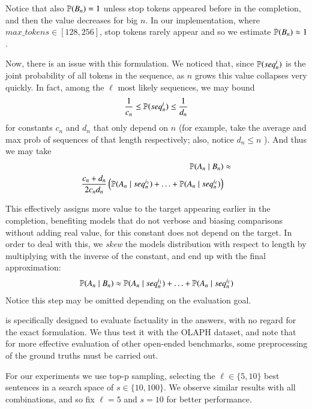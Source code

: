 Notice that also $\mathbb{P}(B_n) = 1$ unless stop tokens appeared before in the completion, and then the value decreases for big $n$. In our implementation, where $max\_tokens \in [128, 256]$, stop tokens rarely appear and so we estimate $\mathbb{P}(B_n) \approx 1$.


Now, there is an issue with this formulation. We noticed that, since $\mathbb{P}(seq_n^{i})$ is the joint probability of all tokens in the sequence, as $n$ grows this value collapses very quickly. In fact, among the $\ell$ most likely sequences, we may bound 
\begin{align*}
    \frac{1}{c_n} \leq \mathbb{P}(seq_n^i) \leq \frac{1}{d_n}
\end{align*}
for constants $c_n$ and $d_n$ that only depend on $n$ (for example, take the average and max prob of sequences of that length respectively; also, notice $d_n \leq n$ ). And thus we may take
\begin{align*}
    \mathbb{P}(A_n \mid B_n) &\approx \\ \frac{c_n + d_n}{2 c_n d_n} \left( \mathbb{P}(A_n \mid seq^{i_1}_n) + \hdots + \mathbb{P}(A_n \mid seq^{i_\ell}_n) \right)
\end{align*}

This effectively assigns more value to the target appearing earlier in the completion, benefiting models that do not verbose and biasing comparisons without adding real value, for this constant does not depend on the target. In order to deal with this, we \emph{skew} the models distribution with respect to length by multiplying with the inverse of the constant, and end up with the final approximation:
\begin{align*}
    \mathbb{P}(A_n \mid B_n) \approx \mathbb{P}(A_n \mid seq^{i_1}_n) + \hdots + \mathbb{P}(A_n \mid seq^{i_\ell}_n)
\end{align*}
Notice this step may be omitted depending on the evaluation goal.

\relaxed{} is specifically designed to evaluate factuality in the answers, with no regard for the exact formulation. We thus test it with the OLAPH \cite{jeong2024olaph} dataset, and note that for more effective evaluation of other open-ended benchmarks, some preprocessing of the ground truths must be carried out. 





For our experiments we use top-p sampling, selecting the $\ell \in \{5, 10\}$ best sentences in a search space of $s \in \{10, 100\}$. We observe similar results with all combinations, and so fix $\ell = 5$ and $s = 10$ for better performance.


